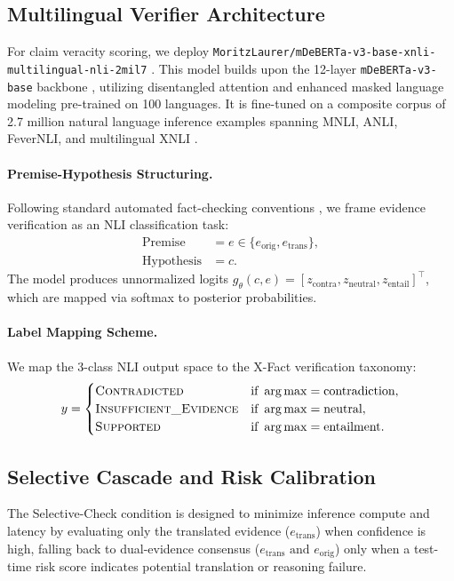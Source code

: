 \subsection{Multilingual Verifier Architecture}
For claim veracity scoring, we deploy \texttt{MoritzLaurer/mDeBERTa-v3-base-xnli-multilingual-nli-2mil7} \citep{laurer-etal-2024-less}. This model builds upon the 12-layer \texttt{mDeBERTa-v3-base} backbone \citep{he-etal-2021-deberta}, utilizing disentangled attention and enhanced masked language modeling pre-trained on 100 languages. It is fine-tuned on a composite corpus of 2.7 million natural language inference examples spanning MNLI, ANLI, FeverNLI, and multilingual XNLI \citep{conneau-etal-2020-unsupervised}.

\paragraph{Premise-Hypothesis Structuring.}
Following standard automated fact-checking conventions \citep{thorne-etal-2018-fever,shcharbakova-etal-2025-scale}, we frame evidence verification as an NLI classification task:
\begin{align}
    \text{Premise} &= e \in \{e_{\text{orig}}, e_{\text{trans}}\}, \\
    \text{Hypothesis} &= c.
\end{align}
The model produces unnormalized logits $g_\theta(c, e) = [z_{\text{contra}}, z_{\text{neutral}}, z_{\text{entail}}]^\top$, which are mapped via softmax to posterior probabilities.

\paragraph{Label Mapping Scheme.}
We map the 3-class NLI output space to the X-Fact verification taxonomy:
\begin{equation}
    y = \begin{cases}
        \textsc{Contradicted} & \text{if } \arg\max = \text{contradiction}, \\
        \textsc{Insufficient\_Evidence} & \text{if } \arg\max = \text{neutral}, \\
        \textsc{Supported} & \text{if } \arg\max = \text{entailment}.
    \end{cases}
\end{equation}

\subsection{Selective Cascade and Risk Calibration}
\label{sec:risk_calibration}
The Selective-Check condition is designed to minimize inference compute and latency by evaluating only the translated evidence ($e_{\text{trans}}$) when confidence is high, falling back to dual-evidence consensus ($e_{\text{trans}} \text{ and } e_{\text{orig}}$) only when a test-time risk score indicates potential translation or reasoning failure.


